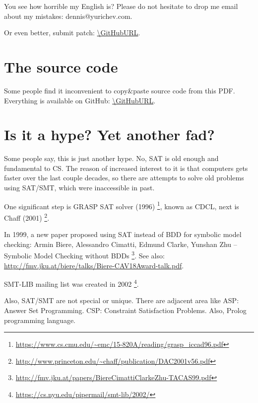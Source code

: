 You see how horrible my English is?
Please do not hesitate to drop me email about my mistakes:
dennis@yurichev.com.

Or even better, submit patch: \url{\GitHubURL}.

\iffalse
\section{Illustrator wanted}

... who can draw in the following manner:
\href{https://github.com/DennisYurichev/RE-for-beginners/blob/master/cover.jpg}{1},
\href{https://github.com/DennisYurichev/RE-for-beginners/blob/master/cover2.jpg}{2},
\href{https://github.com/DennisYurichev/RE-for-beginners/blob/master/cover3.jpg}{3},
\href{https://github.com/DennisYurichev/RE-for-beginners/blob/master/cover4.jpg}{4}.

... for this book, which is open-source and free, and unlikely to be published.
However, someone maybe interested, in a self-advertisement sense...

Please contact me: dennis@yurichev.com.
\fi

\section{The source code}

Some people find it inconvenient to copy\&paste source code from this PDF.
Everything is available on GitHub: \url{\GitHubURL}.

\section{Is it a hype? Yet another fad?}

Some people say, this is just another hype.
No, \ac{SAT} is old enough and fundamental to \ac{CS}.
The reason of increased interest to it is that computers gets faster over the last couple decades,
so there are attempts to solve old problems using \ac{SAT}/\ac{SMT}, which were inaccessible in past.

One significant step is GRASP SAT solver (1996)
\footnote{\url{https://www.cs.cmu.edu/~emc/15-820A/reading/grasp_iccad96.pdf}}, known as \ac{CDCL},
next is Chaff (2001)
\footnote{\url{http://www.princeton.edu/~chaff/publication/DAC2001v56.pdf}}.

In 1999, a new paper proposed using SAT instead of BDD for symbolic model checking:
Armin Biere, Alessandro Cimatti, Edmund Clarke, Yunshan Zhu -- Symbolic Model Checking without BDDs
\footnote{\url{http://fmv.jku.at/papers/BiereCimattiClarkeZhu-TACAS99.pdf}}.
See also: \url{http://fmv.jku.at/biere/talks/Biere-CAV18Award-talk.pdf}.

SMT-LIB mailing list was created in 2002
\footnote{\url{https://cs.nyu.edu/pipermail/smt-lib/2002/}}.

Also, SAT/SMT are not special or unique.
There are adjacent area like ASP: Answer Set Programming.
CSP: Constraint Satisfaction Problems.
Also, Prolog programming language.

